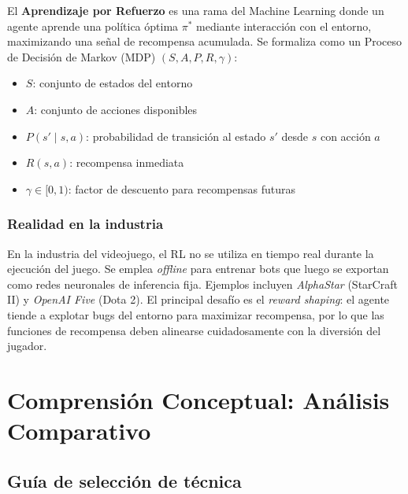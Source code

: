 \documentclass[12pt,letterpaper]{article}
\begin{document}
El \textbf{Aprendizaje por Refuerzo} es una rama del Machine Learning donde un agente aprende una política óptima \(\pi^*\) mediante interacción con el entorno, maximizando una señal de recompensa acumulada. Se formaliza como un Proceso de Decisión de Markov (MDP) \((S, A, P, R, \gamma)\):

\begin{itemize}[nosep]
  \item \(S\): conjunto de estados del entorno
  \item \(A\): conjunto de acciones disponibles
  \item \(P(s' \mid s, a)\): probabilidad de transición al estado \(s'\) desde \(s\) con acción \(a\)
  \item \(R(s, a)\): recompensa inmediata
  \item \(\gamma \in [0, 1)\): factor de descuento para recompensas futuras
\end{itemize}

\subsubsection{Realidad en la industria}

En la industria del videojuego, el RL no se utiliza en tiempo real durante la ejecución del juego. Se emplea \textit{offline} para entrenar bots que luego se exportan como redes neuronales de inferencia fija. Ejemplos incluyen \textit{AlphaStar} (StarCraft II) y \textit{OpenAI Five} (Dota 2). El principal desafío es el \textit{reward shaping}: el agente tiende a explotar bugs del entorno para maximizar recompensa, por lo que las funciones de recompensa deben alinearse cuidadosamente con la diversión del jugador.

\section{Comprensión Conceptual: Análisis Comparativo}

\subsection{Guía de selección de técnica}
\end{document}

